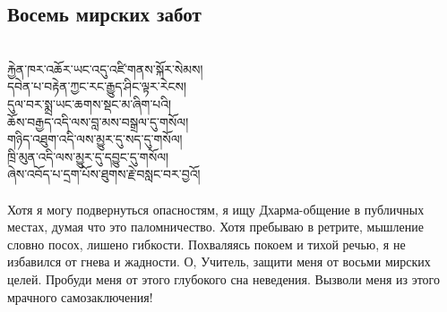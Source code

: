 \subsection*{Восемь мирских забот}
\\
\ti
རྐྱེན་ཁར་འཆོར་ཡང་འདུ་འཛི་གནས་སྐོར་སེམས།\\
དབེན་པ་བརྟེན་ཀྱང་རང་རྒྱུད་ཤིང་ལྟར་རེངས། \\
དུལ་བར་སྨྲ་ཡང་ཆགས་སྡང་མ་ཞིག་པའི། \\
ཆོས་བརྒྱད་འདི་ལས་བླ་མས་བསྒྲལ་དུ་གསོལ། \\
གཉིད་འཐུག་འདི་ལས་མྱུར་དུ་སད་དུ་གསོལ། \\
ཁྲི་མུན་འདི་ལས་མྱུར་དུ་དབྱུང་དུ་གསོལ། \\
ཞེས་འབོད་པ་དྲག་པོས་ཐུགས་རྗེ་བསླང་བར་བྱའོ།\\
\\
\ru
Хотя я могу подвернуться опасностям, я ищу Дхарма-общение
в публичных местах, думая что это паломничество.
Хотя пребы\-ваю в ретрите, мышление словно посох, лишено гибкости.
По\-хваляясь покоем и тихой речью, я не избавился от гнева и жадности.
О, Учитель, защити меня от восьми мирских целей.
Пробуди меня от этого глубокого сна неведения.
Вызволи меня из этого мрачного самозаключения!

